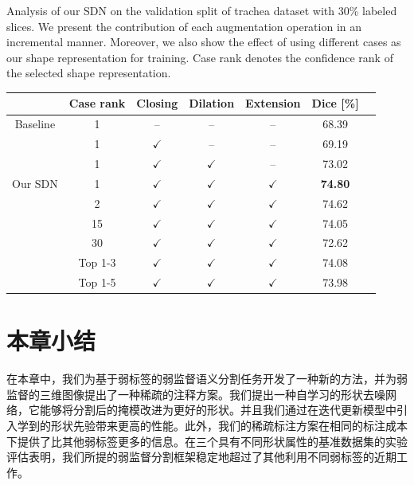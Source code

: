     \begin{table}[t!]
        \centering
        {Analysis of our SDN on the validation split of trachea dataset with 30\% labeled slices. We present the contribution of each augmentation operation in an incremental manner. Moreover, we also show the effect of using different cases as our shape representation for training. Case rank denotes the confidence rank of the selected shape representation.}
        \label{tab:ablation_aug}        
            \begin{tabular}{c c c c c c c}
                \toprule
                & Case rank & Closing     & Dilation     & Extension      & Dice [\%]  \\ \midrule
                Baseline & 1 & --              & --                & --                & 68.39        \\
                & 1 & $\checkmark$    & --                & --                & 69.19         \\ %
                & 1 & $\checkmark$    & $\checkmark$      & --                & 73.02        \\ %
                Our SDN  & 1 & $\checkmark$    & $\checkmark$      & $\checkmark$      & \textbf{74.80}             \\ \midrule
                & 2 & $\checkmark$    & $\checkmark$      & $\checkmark$      & 74.62             \\ 
                & 15 & $\checkmark$    & $\checkmark$      & $\checkmark$      & 74.05             \\ 
                & 30 & $\checkmark$    & $\checkmark$      & $\checkmark$      & 72.62             \\ 
                \midrule
                & Top 1-3 & $\checkmark$    & $\checkmark$      & $\checkmark$      & 74.08             \\
                & Top 1-5 & $\checkmark$    & $\checkmark$      & $\checkmark$      & 73.98             \\
                \bottomrule
            \end{tabular}
    \end{table}






\section{本章小结}
在本章中，我们为基于弱标签的弱监督语义分割任务开发了一种新的方法，并为弱监督的三维图像提出了一种稀疏的注释方案。我们提出一种自学习的形状去噪网络，它能够将分割后的掩模改进为更好的形状。并且我们通过在迭代更新模型中引入学到的形状先验带来更高的性能。此外，我们的稀疏标注方案在相同的标注成本下提供了比其他弱标签更多的信息。在三个具有不同形状属性的基准数据集的实验评估表明，我们所提的弱监督分割框架稳定地超过了其他利用不同弱标签的近期工作。